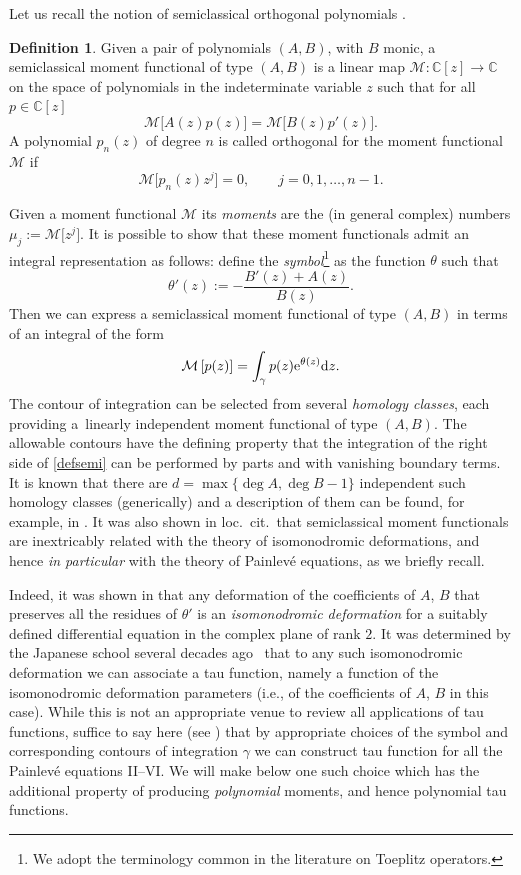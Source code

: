 \documentclass[10pt,a4paper]{amsart}
\numberwithin{equation}{section}
\theoremstyle{definition}
\newtheorem{Definition}[Theorem]{Definition}
\def\le{\left}
\def\ri{\right}
\def \d{{\mathrm d}}
\def\be{\begin{equation}}
\def\ee{\end{equation}}
\def\M{{\mathcal M}}
\def\C{{\mathbb C}}
\begin{document}
Let us recall the notion of semiclassical orthogonal polynomials \cite{Marcellan0,Marcellan,Maroni,Shohat}.
\begin{Definition}\label{defSOP}
Given a pair of polynomials $(A,B)$, with $B$ monic, a semiclassical moment functional of type $(A,B)$ is a linear map $\M\colon\C[z]\to \C$ on the space of polynomials in the indeterminate variable $z$ such that for all $p\in \C[z]$
\be
\label{defsemi}
\M\big[A(z) p(z)\big] = \M \big[B(z) p'(z)\big].
\ee
A polynomial $p_n(z)$ of degree $n$ is called {\rm orthogonal} for the moment functional $\mathcal M$ if
\[
\M\big[p_n(z) z^j\big]=0, \qquad j=0,1,\dots, n-1.
\]
\end{Definition}
Given a moment functional $\M$ its {\it moments} are the (in general complex) numbers
$
\mu_j:= \mathcal M\big[z^j\big]$.
 It is possible to show that these moment functionals admit an integral representation as follows: define the {\it symbol}\footnote{We adopt the terminology common in the literature on Toeplitz operators. } as the function $\theta$ such that
\[%
\theta'(z):= -\frac {B'(z)+A(z)}{B(z)}.
\]
Then we can express a semiclassical moment functional of type $(A,B)$ in terms of an integral of the form
\[
\M\le[p(z)\ri] = \int_\gamma p(z) {\rm e}^{\theta(z)} \d z.
\]
The contour of integration can be selected from several {\it homology classes}, each providing a~linearly independent moment functional of type $(A,B)$. The allowable contours have the defining property that the integration of the right side of \eqref{defsemi} can be performed by parts and with vanishing boundary terms.
It is known that there are $d = \max\{\deg A, \deg B-1\}$ independent such homology classes (generically) and a description of them can be found, for example, in \cite{Bertola:Semiiso}.
It was also shown in loc.\ cit.\ that semiclassical moment functionals are inextricably related with the theory of isomonodromic deformations, and hence {\it in particular} with the theory of Painlev\'e equations, as we briefly recall.

Indeed, it was shown in \cite{Bertola:Semiiso} that any deformation of the coefficients of $A$, $B$ that preserves all the residues of $\theta'$ is an {\it isomonodromic deformation} for a suitably defined differential equation in the complex plane of rank $2$. It was determined by the Japanese school several decades ago~\cite{JMU1,JMU2} that to any such isomonodromic deformation we can associate a tau function, namely a function of the isomonodromic deformation parameters (i.e., of the coefficients of $A$, $B$ in this case). While this is not an appropriate venue to review all applications of tau functions, suffice to say here (see \cite[Remark~5.3]{Bertola:Semiiso}) that by appropriate choices of the symbol and corresponding contours of integration $\gamma$ we can construct tau function for all the Painlev\'e equations II--VI. We will make below one such choice which has the additional property of producing {\it polynomial} moments, and hence polynomial tau functions.
\end{document}
